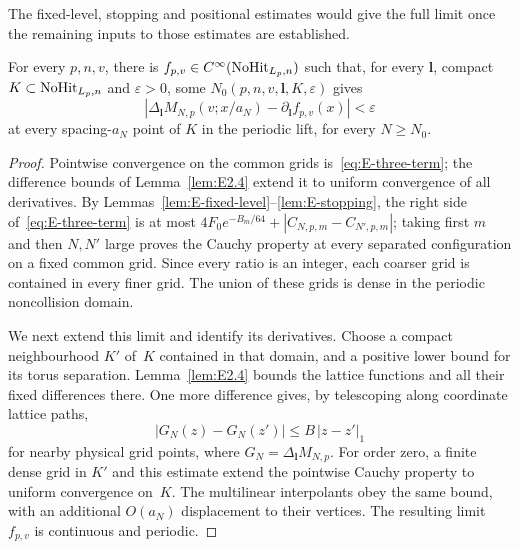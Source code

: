 The fixed-level, stopping and positional estimates would give the full limit once the remaining inputs to those estimates are established.
\begin{lemma}\label{lem:E3.1}
For every $p,n,v$, there is $f_{p,v}\in C^\infty(\mathrm{NoHit}_{L_p,n})$ such that, for every $\boldsymbol l$, compact $K\subset\mathrm{NoHit}_{L_p,n}$ and $\varepsilon>0$, some $N_0(p,n,v,\boldsymbol l,K,\varepsilon)$ gives
\begin{equation*}
|\Delta_{\boldsymbol l}M_{N,p}(v;x/a_N)-\partial_{\boldsymbol l}f_{p,v}(x)|<\varepsilon
\end{equation*}
at every spacing-$a_N$ point of $K$ in the periodic lift, for every $N\ge N_0$.
\end{lemma}
\begin{proof}
Pointwise convergence on the common grids is~\eqref{eq:E-three-term}; the difference bounds of Lemma~\ref{lem:E2.4} extend it to uniform convergence of all derivatives. By Lemmas~\ref{lem:E-fixed-level}--\ref{lem:E-stopping}, the right side of~\eqref{eq:E-three-term} is at most $4F_0e^{-B_m/64}+|C_{N,p,m}-C_{N',p,m}|$; taking first $m$ and then $N,N'$ large proves the Cauchy property at every separated configuration on a fixed common grid. Since every ratio is an integer, each coarser grid is contained in every finer grid. The union of these grids is dense in the periodic noncollision domain.

We next extend this limit and identify its derivatives. Choose a compact neighbourhood $K'$ of~$K$ contained in that domain, and a positive lower bound for its torus separation. Lemma~\ref{lem:E2.4} bounds the lattice functions and all their fixed differences there. One more difference gives, by telescoping along coordinate lattice paths,
\begin{equation*}
|G_N(z)-G_N(z')|\le B\,|z-z'|_1
\end{equation*}
for nearby physical grid points, where $G_N=\Delta_{\boldsymbol l}M_{N,p}$. For order zero, a finite dense grid in $K'$ and this estimate extend the pointwise Cauchy property to uniform convergence on~$K$. The multilinear interpolants obey the same bound, with an additional $O(a_N)$ displacement to their vertices. The resulting limit~$f_{p,v}$ is continuous and periodic.


\end{proof}
